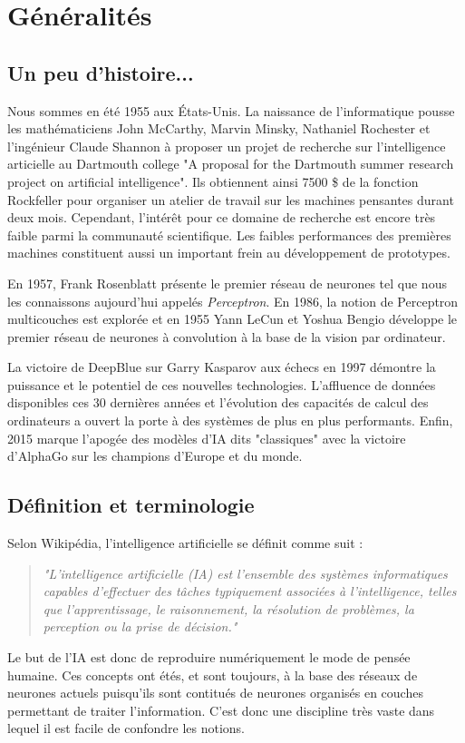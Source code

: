 \minitoc


\section{Généralités}

\subsection{Un peu d'histoire...}

Nous sommes en été 1955 aux États-Unis. La naissance de l'informatique pousse les mathématiciens  John McCarthy, Marvin Minsky, Nathaniel Rochester et l'ingénieur Claude Shannon à proposer  un projet de recherche sur l'intelligence articielle au Dartmouth college "A proposal for the Dartmouth summer research project on artificial intelligence". Ils obtiennent ainsi 7500 \$ de la fonction Rockfeller  pour organiser un atelier de travail sur les machines pensantes durant deux mois. 
Cependant, l'intérêt pour ce domaine de recherche est encore très faible parmi la communauté scientifique.  Les faibles performances des premières machines constituent aussi un important frein au développement de prototypes. 

En 1957, Frank Rosenblatt présente le premier réseau de neurones tel que nous les connaissons aujourd'hui appelés \emph{Perceptron}. En 1986, la notion de Perceptron multicouches est explorée et en 1955 Yann LeCun et Yoshua Bengio
développe le premier réseau de neurones à convolution à la base de la vision par ordinateur. 

La victoire de DeepBlue sur Garry Kasparov aux échecs en 1997 démontre la puissance et le potentiel de ces  nouvelles technologies. L'affluence de données disponibles ces 30 dernières années et l'évolution  des capacités de calcul des ordinateurs a ouvert la porte à des systèmes de plus en plus performants.  Enfin, 2015 marque l'apogée des modèles d'IA dits "classiques" avec la victoire d'AlphaGo sur les champions  d'Europe et du monde. 

\subsection{Définition et terminologie}

Selon Wikipédia, l'intelligence artificielle se définit comme suit : 
\begin{quote}
    \emph{"L'intelligence artificielle (IA) est l'ensemble des systèmes informatiques capables d'effectuer des tâches  typiquement associées à l'intelligence, telles que l'apprentissage, le raisonnement, la résolution de problèmes, la perception ou la prise de décision."}
\end{quote}
Le but de l'IA est donc de reproduire numériquement le mode de pensée humaine. Ces concepts ont étés, et sont toujours,  à la base des réseaux de neurones actuels puisqu'ils sont contitués de neurones organisés en couches permettant de  traiter l'information. C'est donc une discipline très vaste dans lequel il est facile de confondre les notions. 


